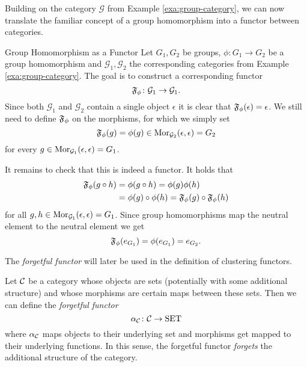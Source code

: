 
Building on the category $\mathcal{G}$ from Example \ref{exa:group-category}, we can now translate the familiar concept of a group homomorphism into a functor between categories.

\begin{example}{Group Homomorphism as a Functor}{}
Let $G_1, G_2$ be groups, $\phi\colon G_1 \to G_2$ be a group homomorphism and $\mathcal{G}_1,\mathcal{G}_2$ the corresponding categories from Example \ref{exa:group-category}. The goal is to construct a corresponding functor 
$$
\mathfrak{F}_\phi\colon \mathcal{G}_1 \to \mathcal{G}_1.
$$
Since both $\mathcal{G}_1$ and $\mathcal{G}_2$ contain a single object $\epsilon$ it is clear that $\mathfrak{F}_\phi(\epsilon) = \epsilon$. We still need to define $\mathfrak{F}_\phi$ on the morphisms, for which we simply set
$$
\mathfrak{F}_\phi(g) = \phi(g) \in \mathrm {Mor}_{\mathcal{G}_2}(\epsilon, \epsilon) = G_2
$$
for every $g \in \mathrm {Mor}_{\mathcal{G}_1}(\epsilon, \epsilon) = G_1$. \par

\medskip It remains to check that this is indeed a functor. It holds that
\begin{equation*}
\begin{split}
\mathfrak{F}_\phi(g \circ h) &= \phi(g \circ h) = \phi(g)\phi(h) \\
&= \phi(g) \circ \phi(h) = \mathfrak{F}_\phi(g) \circ \mathfrak{F}_\phi(h)
\end{split}
\end{equation*}
for all $g,h \in \mathrm {Mor}_{\mathcal{G}_1}(\epsilon, \epsilon) = G_1$. Since group homomorphisms map the neutral element to the neutral element we get
\begin{equation*}
\mathfrak{F}_\phi(e_{G_1}) = \phi(e_{G_1}) = e_{G_2}.
\end{equation*}
\end{example}

The \emph{forgetful functor} will later be used in the definition of clustering functors.

\begin{definition}{\cite[Chap.~1~Ex.~10]{Roman2017}}{}
Let $\mathcal{C}$ be a category whose objects are sets (potentially with some additional structure) and whose morphisms are certain maps between these sets. Then we can define the \emph{forgetful functor}
$$
\alpha_{\mathcal{C}}\colon \mathcal{C} \to \mathrm{SET}
$$
where $\alpha_{\mathcal{C}}$ maps objects to their underlying set and morphisms get mapped to their underlying functions. In this sense, the forgetful functor \emph{forgets} the additional structure of the category.
\end{definition}

